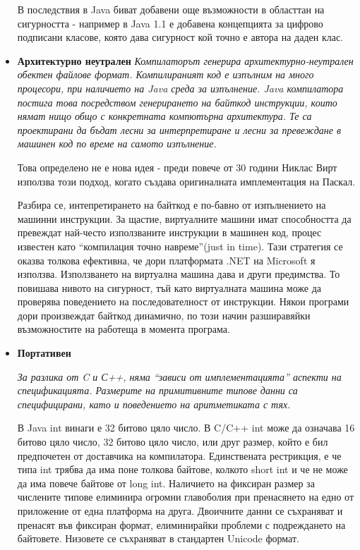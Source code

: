 \begin{itemize}
В последствия в Java биват добавени още възможности в областтан на
сигурността - например в Java 1.1 е добавена концепцията за цифрово
подписани класове, която дава сигурност кой точно е автора на даден клас.

  \item \textbf{Архитектурно неутрален}
    \emph{Компилаторът генерира архитектурно-неутрален обектен файлове
    формат. Компилираният код е изпълним на много процесори, при
    наличието на Java среда за изпълнение. Java компилатора постига
    това посредством генерирането на байткод инструкции, които нямат
    нищо общо с конкретната компютърна архитектура. Те са проектирани
    да бъдат лесни за интерпретиране и лесни за превеждане в машинен
    код по време на самото изпълнение.}

    Това определено не е нова идея - преди повече от 30 години Никлас
    Вирт използва този подход, когато създава оригиналната
    имплементация на Паскал. 

    Разбира се, интепретирането на байткод е по-бавно от изпълнението
    на машинни инструкции. За щастие, виртуалните машини имат
    способността да превеждат най-често използваните инструкции в
    машинен код, процес известен като "`компилация точно
    навреме"'(just in time). Тази стратегия се оказва толкова
    ефективна, че дори платформата .NET на Microsoft я
    използва. Използването на виртуална машина дава и други
    предимства. То повишава нивото на сигурност, тъй като виртуалната
    машина може да проверява поведението на последователност от
    инструкции. Някои програми дори произвеждат байткод динамично, по
    този начин разширавяйки възможностите на работеща в момента програма.

  \item \textbf{Портативен}

    \emph{За разлика от C и С++, няма "`зависи от имплементацията"' аспекти на
      спецификацията. Размерите на примитивните типове данни са
      специфицирани, като и поведението на аритметиката с тях.}

    В Java int винаги е 32 битово цяло число. В C/C++ int може да означава
    16 битово цяло число, 32 битово цяло число, или друг размер, който е
    бил предпочетен от доставчика на компилатора. Единствената рестрикция,
    е че типа int трябва да има поне толкова байтове, колкото short int и
    че не може да има повече байтове от long int. Наличието на фиксиран
    размер за числените типове елиминира огромни главоболия при
    пренасянето на едно от приложение от една платформа на
    друга. Двоичните данни се съхраняват и пренасят във фиксиран формат,
    елиминирайки проблеми с подреждането на байтовете. Низовете се
    съхраняват в стандартен Unicode формат.


\end{itemize}
